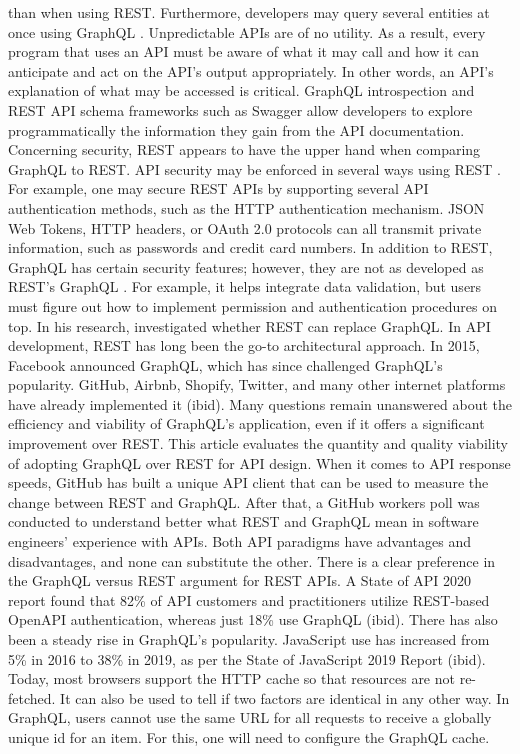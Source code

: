than when using REST. Furthermore, developers may query several entities at
once using GraphQL \citep{lawiEvaluatingGraphQLREST2021}. Unpredictable APIs are
of no utility. As a result, every program that uses an API must be aware of what
it may call and how it can anticipate and act on the API's output appropriately.
In other words, an API's explanation of what may be accessed is critical.
GraphQL introspection and REST API schema frameworks such as Swagger allow
developers to explore programmatically the information they gain from the API
documentation. Concerning security, REST appears to have the upper hand when
comparing GraphQL to REST. API security may be enforced in several ways using
REST \citep{vadlamaniCanGraphQLReplace2021}. For example, one may secure REST
APIs by supporting several API authentication methods, such as the HTTP
authentication mechanism. JSON Web Tokens, HTTP headers, or OAuth 2.0 protocols
can all transmit private information, such as passwords and credit card numbers.
In addition to REST, GraphQL has certain security features; however, they are
not as developed as REST's GraphQL \citep{lawiEvaluatingGraphQLREST2021}. For
example, it helps integrate data validation, but users must figure out how to
implement permission and authentication procedures on top. In his research,
\citet{vadlamaniCanGraphQLReplace2021} investigated whether REST can replace
GraphQL. In API development, REST has long been the go-to architectural approach.
In 2015, Facebook announced GraphQL, which has since challenged GraphQL's
popularity. GitHub, Airbnb, Shopify, Twitter, and many other internet platforms
have already implemented it (ibid). Many questions remain unanswered about the
efficiency and viability of GraphQL's application, even if it offers a
significant improvement over REST. This article evaluates the quantity and
quality viability of adopting GraphQL over REST for API design. When it comes to
API response speeds, GitHub has built a unique API client that can be used to
measure the change between REST and GraphQL. After that, a GitHub workers poll
was conducted to understand better what REST and GraphQL mean in software
engineers' experience with APIs. Both API paradigms have advantages and
disadvantages, and none can substitute the other. There is a clear preference in
the GraphQL versus REST argument for REST APIs. A State of API 2020 report found
that 82\% of API customers and practitioners utilize REST-based OpenAPI
authentication, whereas just 18\% use GraphQL (ibid). There has also been a
steady rise in GraphQL's popularity. JavaScript use has increased from 5\%
in 2016 to 38\% in 2019, as per the State of JavaScript 2019 Report
(ibid). Today, most browsers support the HTTP cache so that resources are not
re-fetched. It can also be used to tell if two factors are identical in any
other way. In GraphQL, users cannot use the same URL for all requests to receive
a globally unique id for an item. For this, one will need to configure the
GraphQL cache.

